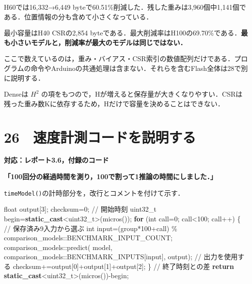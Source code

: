 \documentclass[
  14pt,
  a5paper,
]{extarticle}
\newenvironment{Shaded}{}{}
\newcommand{\CommentTok}[1]{\textcolor[rgb]{0.38,0.63,0.69}{\textit{#1}}}
\newcommand{\ControlFlowTok}[1]{\textcolor[rgb]{0.00,0.44,0.13}{\textbf{#1}}}
\newcommand{\DataTypeTok}[1]{\textcolor[rgb]{0.56,0.13,0.00}{#1}}
\newcommand{\DecValTok}[1]{\textcolor[rgb]{0.25,0.63,0.44}{#1}}
\newcommand{\KeywordTok}[1]{\textcolor[rgb]{0.00,0.44,0.13}{\textbf{#1}}}
\newcommand{\NormalTok}[1]{#1}
\newcommand{\OperatorTok}[1]{\textcolor[rgb]{0.40,0.40,0.40}{#1}}
\renewcommand{\CommentTok}[1]{\textcolor[rgb]{0.25,0.25,0.25}{#1}}
\begin{document}
H60では16,332→6,449
byteで60.51\%削減した．残した重みは3,960個中1,141個である．位置情報の分も含めて小さくなっている．

最小容量はH40 CSRの2,854
byteである．最大削減率はH100の69.70\%である．\textbf{最も小さいモデルと，削減率が最大のモデルは同じではない．}

ここで数えているのは，重み・バイアス・CSR索引の数値配列だけである．プログラムの命令やArduinoの共通処理は含まない．それらを含むFlash全体は28で別に説明する．

Denseは \(H^2\)
の項をもつので，Hが増えると保存量が大きくなりやすい．CSRは残った重み数Kに依存するため，Hだけで容量を決めることはできない．

\newpage

\section{26　速度計測コードを説明する}\label{ux901fux5ea6ux8a08ux6e2cux30b3ux30fcux30c9ux3092ux8aacux660eux3059ux308b}

\textbf{対応：レポート3.6，付録のコード}

\textbf{「100回分の経過時間を測り，100で割って1推論の時間にしました．」}

\texttt{timeModel()}の計時部分を，改行とコメントを付けて示す．

\begin{Shaded}
\begin{Highlighting}[]
\DataTypeTok{float}\NormalTok{ output}\OperatorTok{[}\DecValTok{3}\OperatorTok{];}\NormalTok{ checksum}\OperatorTok{=}\DecValTok{0}\OperatorTok{;}
\CommentTok{// 開始時刻}
\DataTypeTok{uint32\_t}\NormalTok{ begin}\OperatorTok{=}\KeywordTok{static\_cast}\OperatorTok{\textless{}}\DataTypeTok{uint32\_t}\OperatorTok{\textgreater{}(}\NormalTok{micros}\OperatorTok{());}
\ControlFlowTok{for} \OperatorTok{(}\DataTypeTok{int}\NormalTok{ call}\OperatorTok{=}\DecValTok{0}\OperatorTok{;}\NormalTok{ call}\OperatorTok{\textless{}}\DecValTok{100}\OperatorTok{;}\NormalTok{ call}\OperatorTok{++)} \OperatorTok{\{}
  \CommentTok{// 保存済み9入力から選ぶ}
  \DataTypeTok{int}\NormalTok{ input}\OperatorTok{=(}\NormalTok{group}\OperatorTok{*}\DecValTok{100}\OperatorTok{+}\NormalTok{call}\OperatorTok{)}
    \OperatorTok{\%}\NormalTok{ comparison\_models}\OperatorTok{::}\NormalTok{BENCHMARK\_INPUT\_COUNT}\OperatorTok{;}
\NormalTok{  comparison\_models}\OperatorTok{::}\NormalTok{predict}\OperatorTok{(}
\NormalTok{    model}\OperatorTok{,}
\NormalTok{    comparison\_models}\OperatorTok{::}\NormalTok{BENCHMARK\_INPUTS}\OperatorTok{[}\NormalTok{input}\OperatorTok{],}
\NormalTok{    output}\OperatorTok{);}
  \CommentTok{// 出力を使用する}
\NormalTok{  checksum}\OperatorTok{+=}\NormalTok{output}\OperatorTok{[}\DecValTok{0}\OperatorTok{]+}\NormalTok{output}\OperatorTok{[}\DecValTok{1}\OperatorTok{]+}\NormalTok{output}\OperatorTok{[}\DecValTok{2}\OperatorTok{];}
\OperatorTok{\}}
\CommentTok{// 終了時刻との差}
\ControlFlowTok{return} \KeywordTok{static\_cast}\OperatorTok{\textless{}}\DataTypeTok{uint32\_t}\OperatorTok{\textgreater{}(}\NormalTok{micros}\OperatorTok{()){-}}\NormalTok{begin}\OperatorTok{;}
\end{Highlighting}
\end{Shaded}
\end{document}
